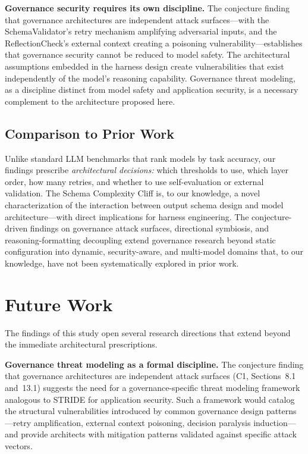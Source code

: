 \documentclass[11pt,a4paper]{article}
\begin{document}
\textbf{Governance security requires its own discipline.} The conjecture finding that governance architectures are independent attack surfaces---with the SchemaValidator's retry mechanism amplifying adversarial inputs, and the ReflectionCheck's external context creating a poisoning vulnerability---establishes that governance security cannot be reduced to model safety. The architectural assumptions embedded in the harness design create vulnerabilities that exist independently of the model's reasoning capability. Governance threat modeling, as a discipline distinct from model safety and application security, is a necessary complement to the architecture proposed here.

\subsection{Comparison to Prior Work}

Unlike standard LLM benchmarks that rank models by task accuracy, our findings prescribe \textit{architectural decisions:} which thresholds to use, which layer order, how many retries, and whether to use self-evaluation or external validation. The Schema Complexity Cliff is, to our knowledge, a novel characterization of the interaction between output schema design and model architecture---with direct implications for harness engineering. The conjecture-driven findings on governance attack surfaces, directional symbiosis, and reasoning-formatting decoupling extend governance research beyond static configuration into dynamic, security-aware, and multi-model domains that, to our knowledge, have not been systematically explored in prior work.

\section{Future Work}

The findings of this study open several research directions that extend beyond the immediate architectural prescriptions.

\textbf{Governance threat modeling as a formal discipline.} The conjecture finding that governance architectures are independent attack surfaces (C1, Sections~8.1 and~13.1) suggests the need for a governance-specific threat modeling framework analogous to STRIDE for application security. Such a framework would catalog the structural vulnerabilities introduced by common governance design patterns---retry amplification, external context poisoning, decision paralysis induction---and provide architects with mitigation patterns validated against specific attack vectors.
\end{document}
